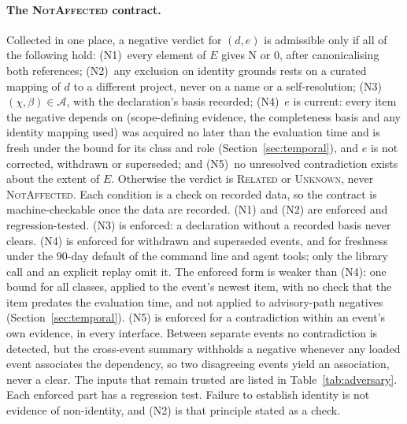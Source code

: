 \documentclass[11pt,a4paper]{article}
\newcommand{\Non}{\textsf{N}}
\newcommand{\NoA}{\textsf{0}}
\begin{document}
\paragraph{The \textsc{NotAffected} contract.} Collected in one place,
a negative verdict for $(d,e)$ is admissible only if all of the
following hold:
(N1)~every element of $E$ gives \Non{} or \NoA{}, after canonicalising
both references; (N2)~any exclusion on identity grounds rests on a
curated mapping of $d$ to a different project, never on a name or a
self-resolution; (N3)~$(\chi, \beta) \in \mathcal{A}$, with the
declaration's basis recorded; (N4)~$e$ is current: every item the
negative depends on (scope-defining evidence, the completeness basis
and any identity mapping used) was acquired no later than the
evaluation time and is fresh under the bound for its class and role
(Section~\ref{sec:temporal}), and $e$ is not corrected, withdrawn or
superseded; and (N5)~no
unresolved contradiction exists about the extent of $E$. Otherwise the
verdict is \textsc{Related} or \textsc{Unknown}, never
\textsc{NotAffected}. Each condition is a check on recorded data, so
the contract is machine-checkable once the data are recorded. (N1)
and (N2) are enforced and regression-tested. (N3) is enforced: a
declaration without a recorded basis never clears. (N4) is enforced
for withdrawn and superseded events, and for freshness under the
90-day default of the command line and agent tools; only the library
call and an explicit replay omit it. The enforced form is weaker than
(N4): one bound for all classes, applied to the event's newest item,
with no check that the item predates the evaluation time, and not
applied to advisory-path negatives (Section~\ref{sec:temporal}). (N5)
is enforced for a contradiction within an event's own evidence, in
every interface. Between separate events no contradiction is detected,
but the cross-event summary withholds a negative whenever any loaded
event associates the dependency, so two disagreeing events yield an
association, never a clear. The inputs that remain trusted are listed
in Table~\ref{tab:adversary}. Each enforced part has a regression test. Failure to establish identity is not
evidence of non-identity, and (N2) is that principle stated as a
check.
\end{document}
